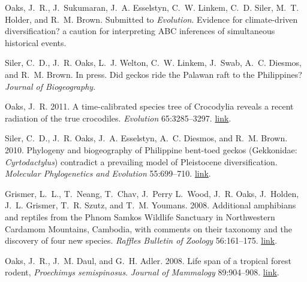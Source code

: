 \documentclass[10pt]{article}
\begin{document}
\renewcommand{\refname}{{\bfseries\large {Peer-reviewed Publications}}}
%
\begin{thebibliography}{6}
\providecommand{\natexlab}[1]{#1}
\providecommand{\url}[1]{\texttt{#1}}
\providecommand{\urlprefix}{URL }

Oaks, J.~R., J.~Sukumaran, J.~A. Esselstyn, C.~W. Linkem, C.~D. Siler, M.~T.
  Holder, and R.~M. Brown. Submitted to \emph{Evolution}.
\newblock Evidence for climate-driven diversification? a caution for
  interpreting {ABC} inferences of simultaneous historical events.

Siler, C.~D., J.~R. Oaks, L.~J. Welton, C.~W. Linkem, J.~Swab, A.~C. Diesmos,
  and R.~M. Brown. In press.
\newblock Did geckos ride the {P}alawan raft to the {P}hilippines?
\newblock \emph{Journal of Biogeography}.

Oaks, J.~R. 2011.
\newblock A time-calibrated species tree of {C}rocodylia reveals a recent
  radiation of the true crocodiles.
\newblock \emph{Evolution} 65:3285--3297.
\newblock
  \href{http://onlinelibrary.wiley.com/doi/10.1111/j.1558-5646.2011.01373.x/abstract}{link}.

Siler, C.~D., J.~R. Oaks, J.~A. Esselstyn, A.~C. Diesmos, and R.~M. Brown.
  2010.
\newblock Phylogeny and biogeography of {P}hilippine bent-toed geckos
  ({G}ekkonidae: \emph{{C}yrtodactylus}) contradict a prevailing model of
  {P}leistocene diversification.
\newblock \emph{Molecular Phylogenetics and Evolution} 55:699--710.
\newblock
  \href{http://www.sciencedirect.com/science/article/pii/S1055790310000382}{link}.

Grismer, L.~L., T.~Neang, T.~Chav, J.~Perry L.~Wood, J.~R. Oaks, J.~Holden,
  J.~L. Grismer, T.~R. Szutz, and T.~M. Youmans. 2008.
\newblock Additional amphibians and reptiles from the {P}hnom {S}amkos
  {W}ildlife {S}anctuary in {N}orthwestern {C}ardamom {M}ountains, {C}ambodia,
  with comments on their taxonomy and the discovery of four new species.
\newblock \emph{Raffles Bulletin of Zoology} 56:161--175.
\newblock
  \href{http://rmbr.nus.edu.sg/rbz/biblio/56/56rbz161-175.pdf}{link}.

Oaks, J.~R., J.~M. Daul, and G.~H. Adler. 2008.
\newblock Life span of a tropical forest rodent, \emph{{P}roechimys
  semispinosus}.
\newblock \emph{Journal of Mammalogy} 89:904--908.
\newblock \href{http://dx.doi.org/10.1644/07-MAMM-A-045.1}{link}.

\end{thebibliography}
\end{document}
